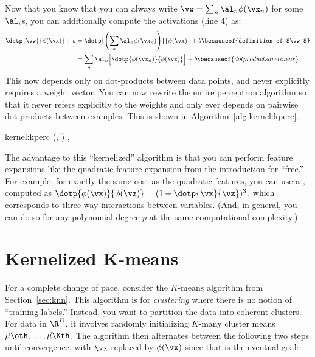 Now that you know that you can always write $\vw = \sum_n \al_n
\phi(\vx_n)$ for some $\al_i$s, you can additionally compute the
activations (line 4) as:
%
\begin{align}
\dotp{\vw}{\phi(\vx)}+b
&= \dotp{\left( \sum_n \al_n \phi(\vx_n) \right)}{\phi(\vx)} + b
\becauseof{definition of $\vw$} \\
&= \sum_n \al_n \Big[ \dotp{\phi(\vx_n)}{\phi(\vx)} \Big] + b
\becauseof{dot products are linear}
\end{align}
%
This now depends only on dot-products between data points, and never
explicitly requires a weight vector.  You can now rewrite the entire
perceptron algorithm so that it never refers explicitly to the weights
and only ever depends on pairwise dot products between examples.  This
is shown in Algorithm~\ref{alg:kernel:kperc}.

\newalgorithm%
  {kernel:kperc}%
  {(, )}
  {
\ENDIF
\ENDFOR
\ENDFOR
\RETURN \VAR{$\vec\al$}, 
}

The advantage to this ``kernelized'' algorithm is that you can perform
feature expansions like the quadratic feature expansion from the
introduction for ``free.''  For example, for exactly the same cost as
the quadratic features, you can use a ,
computed as $\dotp{\phi(\vx)}{\phi(\vz)} = (1 + \dotp{\vx}{\vz})^3$,
which corresponds to three-way interactions between variables.  (And,
in general, you can do so for any polynomial degree $p$ at the same
computational complexity.)

\section{Kernelized K-means}

For a complete change of pace, consider the $K$-means algorithm from
Section~\ref{sec:knn}.  This algorithm is for \emph{clustering}
where there is no notion of ``training labels.''  Instead, you want to
partition the data into coherent clusters.  For data in $\R^D$, it
involves randomly initializing $K$-many cluster means $\vec\mu\oth,
\dots, \vec\mu\Kth$.  The algorithm then alternates between the
following two steps until convergence, with $\vx$ replaced by
$\phi(\vx)$ since that is the eventual goal:

